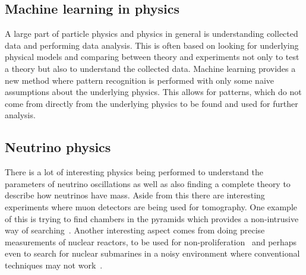 
\subsection{Machine learning in physics}

A large part of particle physics and physics in general is understanding collected data and performing data analysis. This is often based on looking for underlying physical models and comparing between theory and experiments not only to test a theory but also to understand the collected data. Machine learning provides a new method where pattern recognition is performed with only some naive assumptions about the underlying physics. This allows for patterns, which do not come from directly from the underlying physics to be found and used for further analysis.

\subsection{Neutrino physics}

There is a lot of interesting physics being performed to understand the parameters of neutrino oscillations as well as also finding a complete theory to describe how neutrinos have mass. Aside from this there are interesting experiments where muon detectors are being used for tomography. One example of this is trying to find chambers in the pyramids which provides a non-intrusive way of searching~\cite{86Morishima}. Another interesting aspect comes from doing precise measurements of nuclear reactors, to be used for non-proliferation~\cite{87Askins} and perhaps even to search for nuclear submarines in a noisy environment where conventional techniques may not work~\cite{88Jocher}.

\fi
